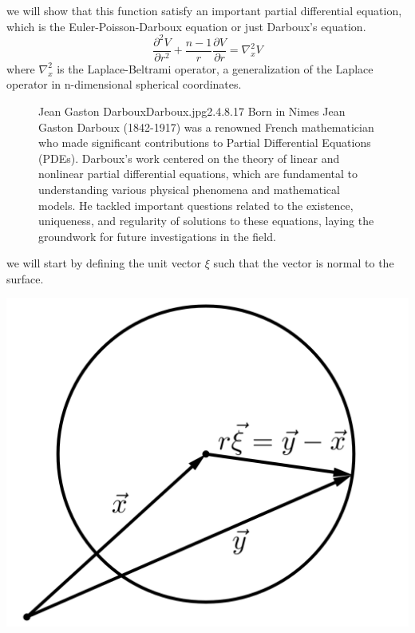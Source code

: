\documentclass[]{article}
\begin{document}
we will show that this function satisfy an important partial differential equation, which is the Euler-Poisson-Darboux equation or just Darboux's equation.
\begin{equation}
\frac{\partial^2 V}{\partial r^2} + \frac{n-1}{r}\frac{\partial V}{\partial r} = \nabla_{x}^{2} V
\end{equation} 
where $\nabla_{x}^{2}$ is the Laplace-Beltrami operator, a generalization of the Laplace operator in n-dimensional spherical coordinates.
\par
\begin{figure}[b]
    \begin{enrichment}{Jean Gaston Darboux}{Darboux.jpg}{2.4}{.8}{.17}
        Born in Nimes Jean Gaston Darboux (1842-1917) was a renowned 
        French mathematician who made significant contributions to Partial Differential Equations (PDEs). 
        Darboux's work centered on the theory of linear and nonlinear partial differential equations, 
        which are fundamental to understanding various physical phenomena and mathematical models. 
        He tackled important questions related to the existence, uniqueness, and regularity of solutions to these equations, 
        laying the groundwork for future investigations in the field.
    \end{enrichment}    
\end{figure}
we will start by defining the unit vector $\xi$ such that the vector is normal to the surface.
\begin{center}
\includegraphics[scale=0.1]{xi.png}
\end{center}
\end{document}
